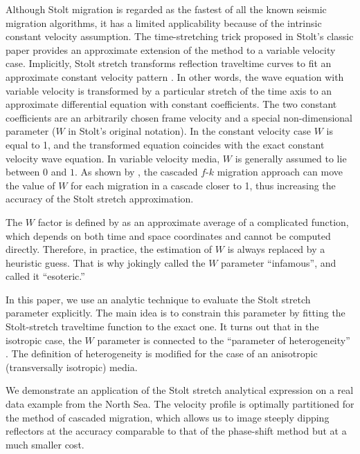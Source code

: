 Although Stolt migration is regarded as the fastest of all the known
seismic migration algorithms, it has a limited applicability because
of the intrinsic constant velocity assumption. The time-stretching
trick proposed in Stolt's classic paper \cite[]{GEO43-01-00230048}
provides an approximate extension of the method to a variable velocity
case.  Implicitly, Stolt stretch transforms reflection traveltime
curves to fit an approximate constant velocity pattern
\cite[]{Levin.sep.35.195,Levin.sep.42.373,Claerbout.blackwell.85}. In other
words, the wave equation with variable velocity is transformed by a
particular stretch of the time axis to an approximate differential
equation with constant coefficients. The two constant coefficients are
an arbitrarily chosen frame velocity and a special non-dimensional
parameter ($W$ in Stolt's original notation). In the constant velocity
case $W$ is equal to 1, and the transformed equation coincides with
the exact constant velocity wave equation. In variable velocity media,
$W$ is generally assumed to lie between $0$ and $1$. As shown by
\cite{GEO52-05-06180643}, the cascaded $f$-$k$ migration
approach can move the value of $W$ for each migration in a cascade
closer to 1, thus increasing the accuracy of the Stolt stretch
approximation.

The $W$ factor is defined by \cite{GEO43-01-00230048} as an
approximate average of a complicated function, which depends on both
time and space coordinates and cannot be computed directly.
Therefore, in practice, the estimation of $W$ is always replaced by a
heuristic guess.  That is why \cite{Levin.sep.35.195} jokingly called the
$W$ parameter ``infamous'', and \cite{GEO52-05-06180643} called it
``esoteric.''

In this paper, we use an analytic technique to evaluate the Stolt
stretch parameter explicitly. The main idea is to constrain this
parameter by fitting the Stolt-stretch traveltime function to the
exact one.  It turns out that in the isotropic case, the $W$ parameter
is connected to the ``parameter of heterogeneity''
\cite[]{ussr,Sword.sep.51.313,castle,nmo}. The definition of
heterogeneity is modified for the case of an anisotropic
(transversally isotropic) media.

We demonstrate an application of the Stolt stretch analytical
expression on a real data example from the North Sea. The velocity
profile is optimally partitioned for the method of cascaded migration,
which allows us to image steeply dipping reflectors at the accuracy
comparable to that of the phase-shift method but at a much smaller
cost.

